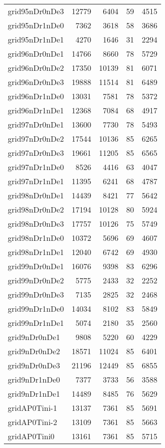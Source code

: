 \begin{longtable}{lrrrr}
grid95nDr0nDe3 & 12779 & 6404 & 59 & 4515 \\
grid95nDr1nDe0 & 7362 & 3618 & 58 & 3686 \\
grid95nDr1nDe1 & 4270 & 1646 & 31 & 2294 \\
grid96nDr0nDe1 & 14766 & 8660 & 78 & 5729 \\
grid96nDr0nDe2 & 17350 & 10139 & 81 & 6071 \\
grid96nDr0nDe3 & 19888 & 11514 & 81 & 6489 \\
grid96nDr1nDe0 & 13031 & 7581 & 78 & 5372 \\
grid96nDr1nDe1 & 12368 & 7084 & 68 & 4917 \\
grid97nDr0nDe1 & 13600 & 7730 & 78 & 5493 \\
grid97nDr0nDe2 & 17544 & 10136 & 85 & 6265 \\
grid97nDr0nDe3 & 19661 & 11205 & 85 & 6565 \\
grid97nDr1nDe0 & 8526 & 4416 & 63 & 4047 \\
grid97nDr1nDe1 & 11395 & 6241 & 68 & 4787 \\
grid98nDr0nDe1 & 14439 & 8421 & 77 & 5642 \\
grid98nDr0nDe2 & 17194 & 10128 & 80 & 5924 \\
grid98nDr0nDe3 & 17757 & 10126 & 75 & 5749 \\
grid98nDr1nDe0 & 10372 & 5696 & 69 & 4607 \\
grid98nDr1nDe1 & 12040 & 6742 & 69 & 4930 \\
grid99nDr0nDe1 & 16076 & 9398 & 83 & 6296 \\
grid99nDr0nDe2 & 5775 & 2433 & 32 & 2252 \\
grid99nDr0nDe3 & 7135 & 2825 & 32 & 2468 \\
grid99nDr1nDe0 & 14034 & 8102 & 83 & 5849 \\
grid99nDr1nDe1 & 5074 & 2180 & 35 & 2560 \\
grid9nDr0nDe1 & 9808 & 5220 & 60 & 4229 \\
grid9nDr0nDe2 & 18571 & 11024 & 85 & 6401 \\
grid9nDr0nDe3 & 21196 & 12449 & 85 & 6855 \\
grid9nDr1nDe0 & 7377 & 3733 & 56 & 3588 \\
grid9nDr1nDe1 & 14489 & 8485 & 76 & 5629 \\
gridAP0Tini-1 & 13137 & 7361 & 85 & 5691 \\
gridAP0Tini-2 & 13109 & 7361 & 85 & 5663 \\
gridAP0Tini0 & 13161 & 7361 & 85 & 5715 \\

\end{longtable}
